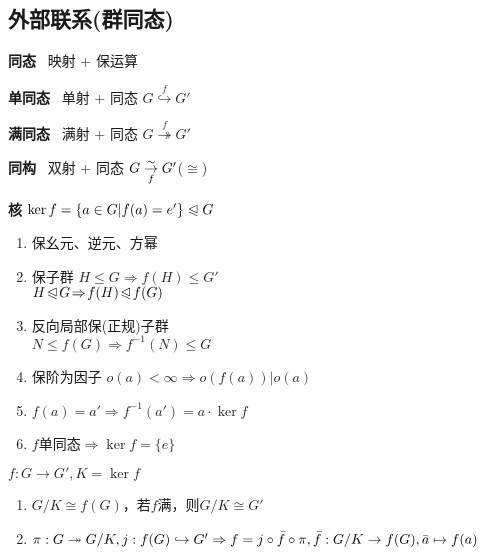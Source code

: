 \documentclass[b4paper, 10pt]{ctexart}
\newcommand*{\impl}{\Rightarrow}
\renewcommand*{\leq}{\leqslant}
\newcommand*{\nmsubgroupeq}{\trianglelefteqslant}
\begin{document}
\begin{multicols}{3}
    \subsection{外部联系(群同态)} \label{sec:group-homomorphism}

    \textbf{同态} \ 映射 + 保运算

    \textbf{单同态} \ 单射 + 同态 $G \overset{f}{\hookrightarrow} G'$

    \textbf{满同态} \ 满射 + 同态 $G \overset{f}{\twoheadrightarrow} G'$

    \textbf{同构} \ 双射 + 同态 $G \overunderset{\sim}{f}{\rightarrow} G'$($\cong$)

    \textbf{核} $\ker f = \{ a \in G | f(a) = e' \} \nmsubgroupeq G$

    \begin{theorem}[同态性质]
        \hfil

        \begin{enumerate}
            \item 保幺元、逆元、方幂
            \item 保子群 $H \leq G \impl f(H) \leq G'$\\
                  $H \!\nmsubgroupeq\! G \!\impl\! f(H) \!\nmsubgroupeq\! f(G)$
            \item 反向局部保(正规)子群 \\
                  $N \!\leq\! f(G) \!\impl\! f^{-1}(N) \!\leq\! G$
            \item 保阶为因子 $o(a) \!<\! \infty \!\impl\! o(f(a)) | o(a)$
            \item $f(a) = a' \impl f^{-1}(a') = a \cdot \ker f$
            \item $f$单同态$\impl \ker f = \{e\}$
        \end{enumerate}
    \end{theorem}

    \begin{theorem}[同态基本定理]
        $f: G \rightarrow G', K = \ker f$

        \begin{enumerate}
            \item $G/K \cong f(G)$，若$f$满，则$G/K \cong G'$
            \item $\pi: G \twoheadrightarrow G/K, j: f(G) \hookrightarrow G' \impl \\ f = j \circ \bar{f} \circ \pi, \bar{f}: G/K \rightarrow f(G), \bar{a} \mapsto f(a)$
        \end{enumerate}


\end{theorem}
\end{multicols}
\end{document}
